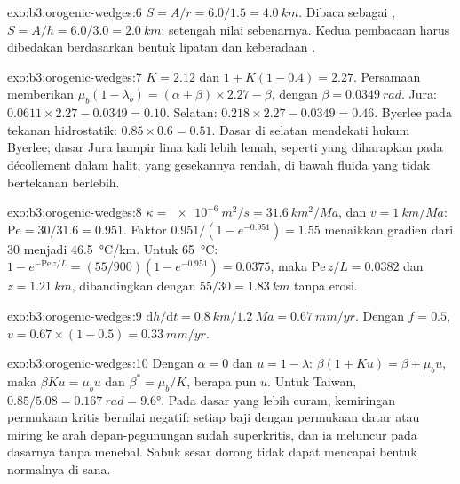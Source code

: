 \begin{solution}{exo:b3:orogenic-wedges:6}
$S = A/r = 6.0/1.5 = \qty{4.0}{km}$. Dibaca sebagai , $S = A/h =
6.0/3.0 = \qty{2.0}{km}$: setengah nilai sebenarnya. Kedua pembacaan harus
dibedakan berdasarkan bentuk lipatan dan keberadaan .
\end{solution}

\begin{solution}{exo:b3:orogenic-wedges:7}
$K = 2.12$ dan $1 + K(1 - 0.4) = 2.27$. Persamaan memberikan $\mu_b(1 -
\lambda_b) = (\alpha + \beta)\times2.27 - \beta$, dengan $\beta =
\qty{0.0349}{rad}$. Jura: $0.0611\times2.27 - 0.0349 = 0.10$. Selatan:
$0.218\times2.27 - 0.0349 = 0.46$. Byerlee pada tekanan hidrostatik:
$0.85\times0.6 = 0.51$. Dasar di selatan mendekati hukum Byerlee; dasar
Jura hampir lima kali lebih lemah, seperti yang diharapkan pada décollement
dalam halit, yang gesekannya rendah, di bawah fluida yang tidak bertekanan berlebih.
\end{solution}

\begin{solution}{exo:b3:orogenic-wedges:8}
$\kappa = \qty{e-6}{m^2/s} = \qty{31.6}{km^2/Ma}$, dan $v =
\qty{1}{km/Ma}$: $\mathrm{Pe} = 30/31.6 = 0.951$. Faktor $0.951/(1 -
e^{-0.951}) = 1.55$ menaikkan gradien dari 30 menjadi \qty{46.5}{\celsius/km}.
Untuk \qty{65}{\celsius}: $1 - e^{-\mathrm{Pe}\,z/L} = (55/900)(1 - e^{-0.951})
= 0.0375$, maka $\mathrm{Pe}\,z/L = 0.0382$ dan $z = \qty{1.21}{km}$, dibandingkan dengan
$55/30 = \qty{1.83}{km}$ tanpa erosi.
\end{solution}

\begin{solution}{exo:b3:orogenic-wedges:9}
$\mathrm dh/\mathrm dt = \qty{0.8}{km}/\qty{1.2}{Ma} = \qty{0.67}{mm/yr}$.
Dengan $f = 0.5$, $v = 0.67\times(1 - 0.5) = \qty{0.33}{mm/yr}$.
\end{solution}

\begin{solution}{exo:b3:orogenic-wedges:10}
Dengan $\alpha = 0$ dan $u = 1 - \lambda$: $\beta(1 + Ku) = \beta + \mu_b u$,
maka $\beta Ku = \mu_b u$ dan $\beta^* = \mu_b/K$, berapa pun $u$. Untuk Taiwan,
$0.85/5.08 = \qty{0.167}{rad} = \ang{9.6}$. Pada dasar yang lebih curam, kemiringan
permukaan kritis bernilai negatif: setiap baji dengan permukaan datar atau miring ke arah depan-pegunungan
sudah superkritis, dan ia meluncur pada dasarnya tanpa menebal. Sabuk
sesar dorong tidak dapat mencapai bentuk normalnya di sana.
\end{solution}

